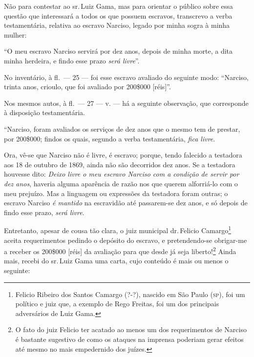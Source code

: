 Não para contestar ao sr.\,Luiz Gama, mas para orientar o público sobre
essa questão que interessará a todos os que possuem escravos, transcrevo
a verba testamentária, relativa ao escravo Narciso, legado por minha
sogra à minha mulher:

``O meu escravo Narciso servirá por dez anos, depois de minha morte, a
dita minha herdeira, e findo esse prazo \emph{será livre}''.

No inventário, à fl.~--- 25 --- foi esse escravo avaliado do seguinte
modo: ``Narciso, trinta anos, crioulo, que foi avaliado por 200\$000
{[}réis{]}''.

Nos mesmos autos, à fl.~--- 27 --- v. --- há a seguinte observação, que
corresponde à disposição testamentária.

``Narciso, foram avaliados os serviços de dez anos que o mesmo tem de
prestar, por 200\$000; findos os quais, segundo a verba testamentária,
\emph{fica livre}.

Ora, vê-se que Narciso não é livre, é escravo; porque, tendo falecido a
testadora aos 18 de outubro de 1869, ainda não são decorridos dez anos.
Se a testadora houvesse dito: \emph{Deixo livre o meu escravo Narciso
com a condição de servir por dez anos}, haveria alguma aparência de
razão nos que querem alforriá-lo com o meu prejuízo. Mas a linguagem ou
expressões da testadora foram outras; o escravo Narciso \emph{é mantido}
na escravidão até passarem-se dez anos, e só depois de findo esse prazo,
\emph{será livre}.

Entretanto, apesar de cousa tão clara, o juiz municipal dr.\,Felicio
Camargo\footnote{ Felicio Ribeiro dos Santos Camargo (?-?), nascido
  em São Paulo (\textsc{sp}), foi um político e juiz que, a exemplo de Rego
  Freitas, foi um dos principais adversários de Luiz Gama.} aceita
requerimentos pedindo o depósito do escravo, e pretendendo-se obrigar-me
a receber os 200\$000 {[}réis{]} da avaliação para que desde já seja
liberto!\footnote{ O fato do juiz Felicio ter acatado ao menos um
  dos requerimentos de Narciso é bastante sugestivo de como os ataques
  na imprensa poderiam gerar efeitos até mesmo no mais empedernido dos
  juízes.} Ainda mais, recebi do sr.\,Luiz Gama uma carta, cujo conteúdo
é mais ou menos o seguinte:

